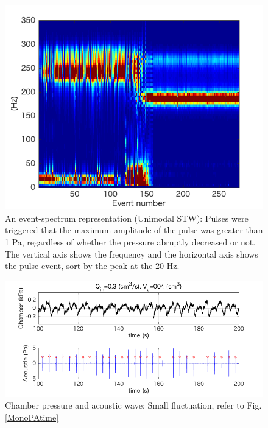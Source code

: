\documentclass[12pt]{article}
\begin{document}
\begin{figure}[H]
\begin{center}
\includegraphics[scale=1] {Monopspec.png} 
\caption{An event-spectrum representation (Unimodal STW): Pulses were triggered that the maximum amplitude of the pulse was greater than 1 Pa, regardless of whether the pressure abruptly decreased or not.
The vertical axis shows the frequency and the horizontal axis shows the pulse event, sort by the peak at the 20 Hz.}
\label{Monopspec}
\end{center}
\end{figure} 

\begin{figure}[H]
\begin{center}
\includegraphics[scale=1] {FlctPAtime.png} 
\caption{Chamber pressure and acoustic wave: Small fluctuation, refer to Fig. \ref{MonoPAtime}}
\label{FlctPAtime}
\end{center}
\end{figure} 
\end{document}
